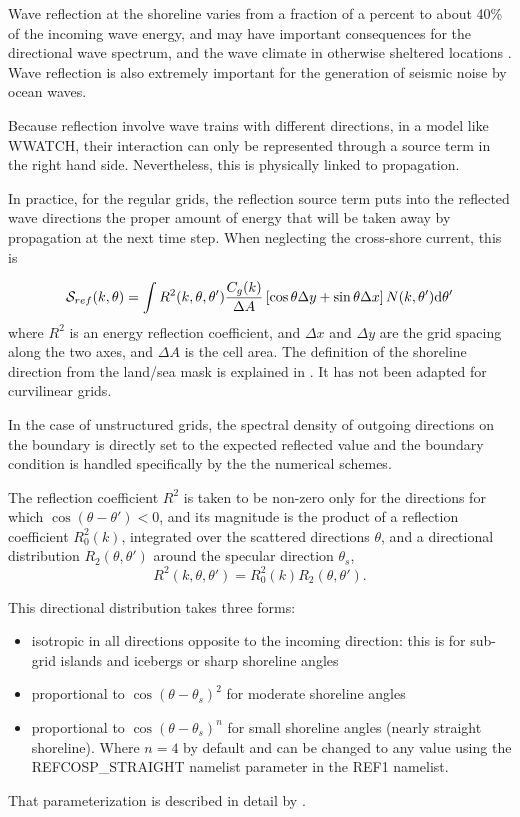Wave reflection at the shoreline varies from a fraction of a percent to about 40\% of the incoming 
wave energy, and may have important consequences for the directional wave spectrum, 
and the wave climate in otherwise sheltered locations \citep{pro:ORe99}. Wave reflection is 
also extremely important for the generation of seismic noise by ocean waves.

Because reflection involve wave trains with different directions, in a model like WWATCH, their interaction can only be 
represented through a source term in the right hand side. Nevertheless, this is physically linked to propagation. 

In practice, for the regular grids, the reflection source term puts into the reflected wave directions the proper amount of energy that will be taken away by propagation 
at the next time step. When neglecting the cross-shore current, this is 

\begin{equation} 
{\cal S}_{ref}(k,\theta) = 
\int R^2(k,\theta,\theta') \frac{C_g(k)}{\Delta A} \left[\cos \theta \Delta y + \sin \theta  \Delta x \right] N(k,\theta') \mathrm{d} \theta'
\end{equation}
where $R^2$ is  an energy reflection coefficient, and $\Delta x$ and $\Delta y$ are the grid spacing along the two axes, and
$\Delta A$ is the cell area. The definition of the shoreline direction from the land/sea mask is explained in \cite{art:Aea11}. It has not 
been adapted for curvilinear grids. 

In the case of unstructured grids, the spectral density of outgoing directions on the boundary 
is directly set to the expected reflected value and the boundary condition is handled specifically by the the numerical schemes. 

The reflection coefficient $R^2$ is taken to be non-zero only for the directions for which  $\cos(\theta-\theta')<0$, and its magnitude 
is the product of a reflection coefficient $R_0^2(k)$, integrated over the scattered directions $\theta$, 
and a directional distribution  $R_2(\theta,\theta')$ around the specular direction $\theta_s$,  
\begin{equation} 
R^2(k,\theta,\theta')  =  R_0^2(k) R_2(\theta,\theta').
\end{equation}

This directional distribution takes three forms: 
\begin{itemize}
 \item isotropic in all directions opposite to the incoming direction: this is for sub-grid islands and icebergs or sharp shoreline angles
 \item proportional to $\cos(\theta-\theta_s)^2$ for moderate shoreline angles
 \item proportional to $\cos(\theta-\theta_s)^n$ for small shoreline angles (nearly straight shoreline). Where $n=4$ by default and can be changed 
to any value using the REFCOSP\_STRAIGHT namelist parameter in the REF1 namelist.
\end{itemize}
That parameterization is described in detail by \cite{art:AR12}. 

